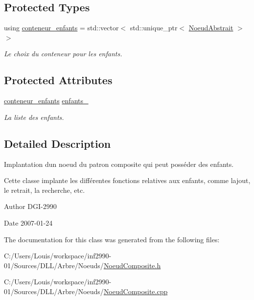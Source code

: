 \subsection*{Protected Types}
\begin{DoxyCompactItemize}
\item 
\hypertarget{class_noeud_composite_ac12bde5084b853e81fa3f7560e8ffeaf}{}using \hyperlink{class_noeud_composite_ac12bde5084b853e81fa3f7560e8ffeaf}{conteneur\+\_\+enfants} = std\+::vector$<$ std\+::unique\+\_\+ptr$<$ \hyperlink{class_noeud_abstrait}{Noeud\+Abstrait} $>$$>$\label{class_noeud_composite_ac12bde5084b853e81fa3f7560e8ffeaf}

\begin{DoxyCompactList}\small\item\em Le choix du conteneur pour les enfants. \end{DoxyCompactList}\end{DoxyCompactItemize}
\subsection*{Protected Attributes}
\begin{DoxyCompactItemize}
\item 
\hypertarget{class_noeud_composite_a628227fd324020e497ada7577457ff3f}{}\hyperlink{class_noeud_composite_ac12bde5084b853e81fa3f7560e8ffeaf}{conteneur\+\_\+enfants} \hyperlink{class_noeud_composite_a628227fd324020e497ada7577457ff3f}{enfants\+\_\+}\label{class_noeud_composite_a628227fd324020e497ada7577457ff3f}

\begin{DoxyCompactList}\small\item\em La liste des enfants. \end{DoxyCompactList}\end{DoxyCompactItemize}


\subsection{Detailed Description}
Implantation d\textquotesingle{}un noeud du patron composite qui peut posséder des enfants. 

Cette classe implante les différentes fonctions relatives aux enfants, comme l\textquotesingle{}ajout, le retrait, la recherche, etc.

\begin{DoxyAuthor}{Author}
D\+G\+I-\/2990 
\end{DoxyAuthor}
\begin{DoxyDate}{Date}
2007-\/01-\/24 
\end{DoxyDate}


The documentation for this class was generated from the following files\+:\begin{DoxyCompactItemize}
\item 
C\+:/\+Users/\+Louis/workspace/inf2990-\/01/\+Sources/\+D\+L\+L/\+Arbre/\+Noeuds/\hyperlink{_noeud_composite_8h}{Noeud\+Composite.\+h}\item 
C\+:/\+Users/\+Louis/workspace/inf2990-\/01/\+Sources/\+D\+L\+L/\+Arbre/\+Noeuds/\hyperlink{_noeud_composite_8cpp}{Noeud\+Composite.\+cpp}\end{DoxyCompactItemize}
